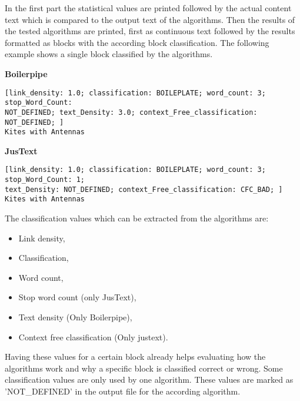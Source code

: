 In the first part the statistical values are printed followed by the actual content text which is compared to the output text of the algorithms. Then the results of the tested algorithms are printed, first as continuous text followed by the results formatted as blocks with the according block classification.
The following example shows a single block classified by the algorithms.


\textbf{Boilerpipe}
\begin{lstlisting}
[link_density: 1.0; classification: BOILEPLATE; word_count: 3; stop_Word_Count: 
NOT_DEFINED; text_Density: 3.0; context_Free_classification: NOT_DEFINED; ]
Kites with Antennas
\end{lstlisting}


\textbf{JusText}
\begin{lstlisting}
[link_density: 1.0; classification: BOILEPLATE; word_count: 3; stop_Word_Count: 1; 
text_Density: NOT_DEFINED; context_Free_classification: CFC_BAD; ] 
Kites with Antennas
\end{lstlisting}

The classification values which can be extracted from the algorithms are:

\begin{itemize}
\item Link density,
\item Classification,
\item Word count,
\item Stop word count (only JusText),
\item Text density (Only Boilerpipe),
\item Context free classification (Only justext).
\end{itemize}

Having these values for a certain block already helps evaluating how the algorithms work and why a specific block is classified correct or wrong. Some classification values are only used by one algorithm. These values are marked as 'NOT\_DEFINED' in the output file for the according algorithm.
